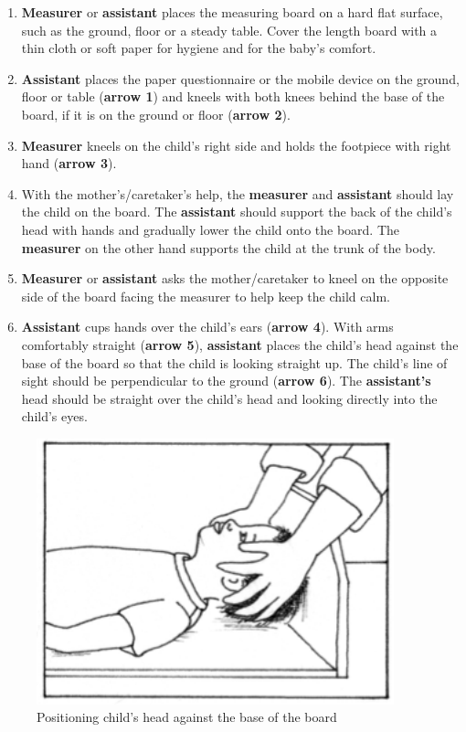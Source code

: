 \documentclass[
  12pt,
]{book}
\begin{document}
\begin{enumerate}
\def\labelenumi{\arabic{enumi}.}
\item
  \textbf{Measurer} or \textbf{assistant} places the measuring board on a hard flat surface, such as the ground, floor or a steady table. Cover the length board with a thin cloth or soft paper for hygiene and for the baby's comfort.
\item
  \textbf{Assistant} places the paper questionnaire or the mobile device on the ground, floor or table (\textbf{arrow 1}) and kneels with both knees behind the base of the board, if it is on the ground or floor (\textbf{arrow 2}).
\item
  \textbf{Measurer} kneels on the child's right side and holds the footpiece with right hand (\textbf{arrow 3}).
\item
  With the mother's/caretaker's help, the \textbf{measurer} and \textbf{assistant} should lay the child on the board. The \textbf{assistant} should support the back of the child's head with hands and gradually lower the child onto the board. The \textbf{measurer} on the other hand supports the child at the trunk of the body.
\item
  \textbf{Measurer} or \textbf{assistant} asks the mother/caretaker to kneel on the opposite side of the board facing the measurer to help keep the child calm.
\item
  \textbf{Assistant} cups hands over the child's ears (\textbf{arrow 4}). With arms comfortably straight (\textbf{arrow 5}), \textbf{assistant} places the child's head against the base of the board so that the child is looking straight up. The child's line of sight should be perpendicular to the ground (\textbf{arrow 6}). The \textbf{assistant's} head should be straight over the child's head and looking directly into the child's eyes.
\end{enumerate}

\begin{figure}

{\centering \includegraphics[width=4.07in]{images/heightBoard05} 

}

\caption{Positioning child's head against the base of the board}\label{fig:height08}
\end{figure}
\end{document}
